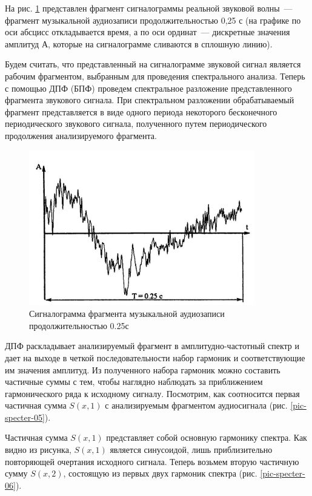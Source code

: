 \documentclass[oneside, final, 14pt]{extreport}
\begin{document}
На рис. \ref{pic-specter-04} представлен фрагмент сигналограммы реальной звуковой волны~--- фрагмент музыкальной аудиозаписи продолжительностью 0,25 с (на графике по оси абсцисс откладывается время, а по оси ординат~--- дискретные значения амплитуд \(А\), которые на сигналограмме сливаются в сплошную линию).

Будем считать, что представленный на сигналограмме звуковой сигнал является рабочим фрагментом, выбранным для проведения спектрального анализа. Теперь с помощью ДПФ (БПФ) проведем спектральное разложение представленного фрагмента звукового сигнала. При спектральном разложении обрабатываемый фрагмент представляется в виде одного периода некоторого бесконечного периодического звукового сигнала, полученного путем периодического продолжения анализируемого фрагмента.

\begin{figure}
\centering
\includegraphics{pic-specter-04}
\caption{Сигналограмма фрагмента музыкальной аудиозаписи продолжительностью 0.25с}
\label{pic-specter-04}
\end{figure}

ДПФ раскладывает анализируемый фрагмент в амплитудно-частотный спектр и дает на выходе в четкой последовательности набор гармоник и соответствующие им значения амплитуд. Из полученного набора гармоник можно составить частичные
суммы с тем, чтобы наглядно наблюдать за приближением гармонического ряда к исходному сигналу.
Посмотрим, как соотносится первая частичная сумма \(S(x,1)\) с анализируемым фрагментом аудиосигнала (рис. \ref{pic-specter-05}).

Частичная сумма \(S(x,1)\) представляет собой основную гармонику спектра. Как видно из рисунка, \(S(x,1)\) является синусоидой, лишь приблизительно повторяющей очертания исходного сигнала. Теперь возьмем вторую частичную сумму \(S(x,2)\), состоящую из первых двух гармоник спектра (рис. \ref{pic-specter-06}).
\end{document}
